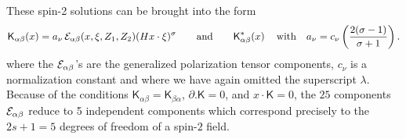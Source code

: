 \documentclass[a4paper,11pt,showpacs,preprintnumbers]{revtex4}
\def\K{\textsf{K}}
\begin{document}
These spin-2 solutions can be brought into the form
\begin{equation}\label{eq:sol}
\K_{\alpha\beta}(x)=a_{\nu}\,{\cal
E}_{\alpha\beta}(x,\xi,Z_1,Z_2)(Hx\cdot\xi)^{\sigma}
\qquad\mbox{and}\qquad \K_{\alpha\beta}^{*}(x)\,
\quad\mbox{with}\quad
a_{\nu}=c_{\nu}\left(\frac{2(\sigma-1)}{\sigma+1}\right).\end{equation}
where the ${\cal E}_{\alpha\beta}$'s are the generalized
polarization tensor components, $c_{\nu}$ is a normalization
constant and where we have again omitted the superscript
$\lambda$. Because of the conditions
$\K_{\alpha\beta}=\K_{\beta\alpha}$, $\partial.\K=0$, and
$x\cdot\K=0$, the $25$ components ${\cal E}_{\alpha \beta}$ reduce
to 5 independent components which correspond precisely to the $2s
+1 =5$ degrees of freedom of a spin-$2$ field.
\end{document}
